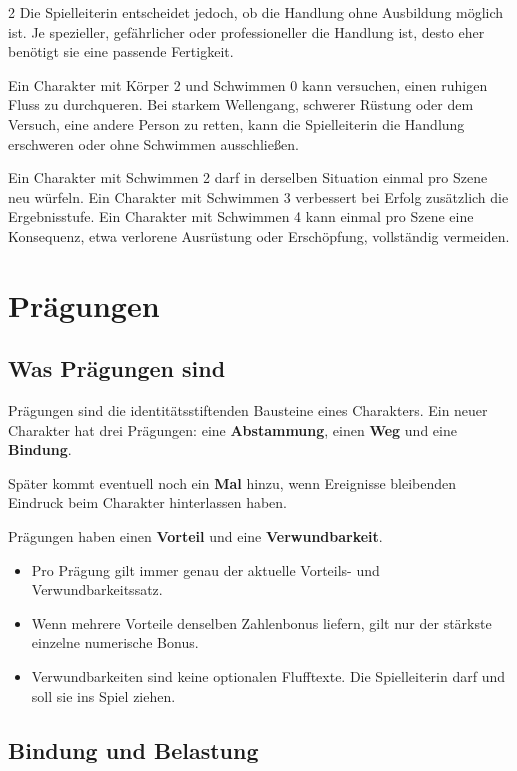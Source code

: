 \begin{multicols*}{2}
Die Spielleiterin entscheidet jedoch, ob die Handlung ohne Ausbildung möglich ist. Je spezieller, gefährlicher oder professioneller die Handlung ist, desto eher benötigt sie eine passende Fertigkeit.

\begin{pexample}
Ein Charakter mit Körper 2 und Schwimmen 0 kann versuchen, einen ruhigen Fluss zu durchqueren. Bei starkem Wellengang, schwerer Rüstung oder dem Versuch, eine andere Person zu retten, kann die Spielleiterin die Handlung erschweren oder ohne Schwimmen ausschließen.

Ein Charakter mit Schwimmen 2 darf in derselben Situation einmal pro Szene neu würfeln. Ein Charakter mit Schwimmen 3 verbessert bei Erfolg zusätzlich die Ergebnisstufe. Ein Charakter mit Schwimmen 4 kann einmal pro Szene eine Konsequenz, etwa verlorene Ausrüstung oder Erschöpfung, vollständig vermeiden.
\end{pexample}

\section{Prägungen}
\subsection{Was Prägungen sind}\label{sec:was-pragungen-sind}

Prägungen sind die identitätsstiftenden Bausteine eines Charakters. Ein neuer Charakter hat drei Prägungen: eine \textbf{Abstammung}, einen \textbf{Weg} und eine \textbf{Bindung}.

Später kommt eventuell noch ein \textbf{Mal} hinzu, wenn Ereignisse bleibenden Eindruck beim Charakter hinterlassen haben.

Prägungen haben einen \textbf{Vorteil} und eine \textbf{Verwundbarkeit}.

\begin{itemize}[leftmargin=*]
\item Pro Prägung gilt immer genau der aktuelle Vorteils- und Verwundbarkeitssatz.
\item Wenn mehrere Vorteile denselben Zahlenbonus liefern, gilt nur der stärkste einzelne numerische Bonus.
\item Verwundbarkeiten sind keine optionalen Flufftexte.
Die Spielleiterin darf und soll sie ins Spiel ziehen.
\end{itemize}

\subsection{Bindung und Belastung}\label{sec:bindung-und-belastung}


\end{multicols*}
